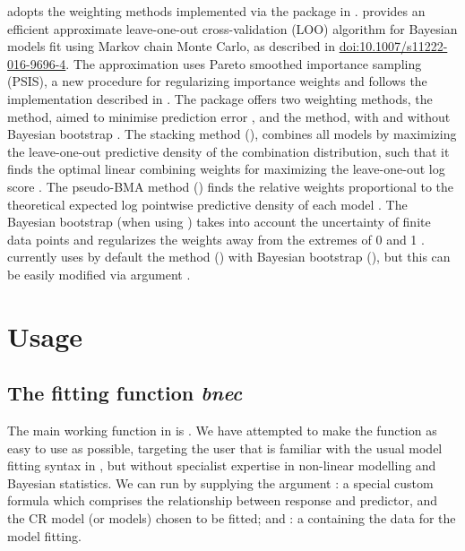 \documentclass[
  shortnames]{jss}
\begin{document}
 adopts the weighting methods implemented via the  \citep{vehtari2020} package in .  provides an efficient approximate leave-one-out cross-validation (LOO) algorithm for Bayesian models fit using Markov chain Monte Carlo, as described in \citep{vehtari2017} \url{doi:10.1007/s11222-016-9696-4}. The approximation uses Pareto smoothed importance sampling (PSIS), a new procedure for regularizing importance weights and follows the implementation described in \citep{Vehtari2019}. The  package offers two weighting methods, the  method, aimed to minimise prediction error \citep{Yao2018}, and the  method, with and without Bayesian bootstrap \citep{vehtari2020, vehtari2017}. The stacking method (), combines all models by maximizing the leave-one-out predictive density of the combination distribution, such that it finds the optimal linear combining weights for maximizing the leave-one-out log score \citep{vehtari2020}. The pseudo-BMA method () finds the relative weights proportional to the theoretical expected log pointwise predictive density of each model \citep{vehtari2020}. The Bayesian bootstrap (when using ) takes into account the uncertainty of finite data points and regularizes the weights away from the extremes of 0 and 1 \citep{vehtari2020}.  currently uses by default the  method () with Bayesian bootstrap (), but this can be easily modified via argument .

\hypertarget{usage}{%
\section{Usage}\label{usage}}

\subsection[The fitting function bnec]{The fitting function \emph{bnec}}\label{ffbnec}

The main working function in  is . We have attempted to make the  function as easy to use as possible, targeting the  user that is familiar with the usual model fitting syntax in , but without specialist expertise in non-linear modelling and Bayesian statistics. We can run  by supplying the argument : a special custom formula which comprises the relationship between response and predictor, and the CR model (or models) chosen to be fitted; and : a  containing the data for the model fitting.
\end{document}
